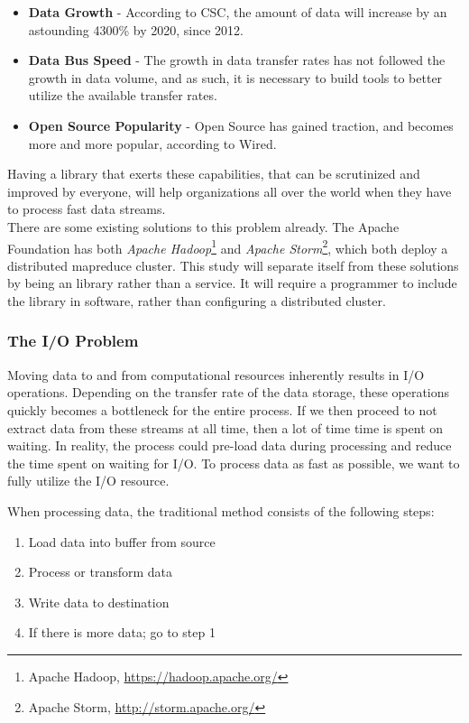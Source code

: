 \documentclass[a4paper]{article}
\begin{document}
\begin{itemize}
\item \textbf{Data Growth} - According to CSC, the amount of data will increase by an astounding 4300\% by 2020, since 2012\cite{datagrowth}. 
\item \textbf{Data Bus Speed} - The growth in data transfer rates has not followed the growth in data volume, and as such, it is necessary to build tools to better utilize the available transfer rates.
\item \textbf{Open Source Popularity} - Open Source has gained traction, and becomes more and more popular, according to Wired\cite{opensourcegrowth}.
\end{itemize} 

Having a library that exerts these capabilities, that can be scrutinized and improved by everyone, will help organizations all over the world when they have to process fast data streams.\\

There are some existing solutions to this problem already. The Apache Foundation has both \textit{Apache Hadoop}\footnote{Apache Hadoop, \url{https://hadoop.apache.org/}} and \textit{Apache Storm}\footnote{Apache Storm, \url{http://storm.apache.org/}}, which both deploy a distributed mapreduce cluster\cite{Dean:2008:MSD:1327452.1327492}. This study will separate itself from these solutions by being an library rather than a service. It will require a programmer to include the library in software, rather than configuring a distributed cluster.


\subsubsection{The I/O Problem}
Moving data to and from computational resources inherently results in I/O operations. Depending on the transfer rate of the data storage, these operations quickly becomes a bottleneck for the entire process. If we then proceed to not extract data from these streams at all time, then a lot of time time is spent on waiting. In reality, the process could pre-load data during processing and reduce the time spent on waiting for I/O. To process data as fast as possible, we want to fully utilize the I/O resource. 

When processing data, the traditional method consists of the following steps:

\begin{enumerate}
\item Load data into buffer from source
\item Process or transform data
\item Write data to destination
\item If there is more data; go to step 1
\end{enumerate}
\end{document}
